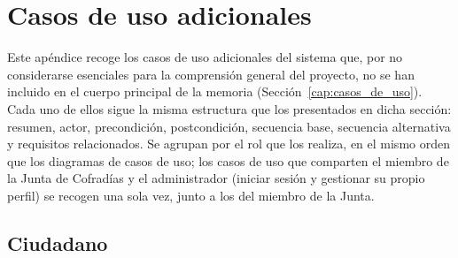 \chapter{Casos de uso adicionales}\label{cap:casos_de_uso_adicionales}

Este apéndice recoge los casos de uso adicionales del sistema que, por no considerarse esenciales para la comprensión general del proyecto, no se han incluido en el cuerpo principal de la memoria (Sección~\ref{cap:casos_de_uso}). Cada uno de ellos sigue la misma estructura que los presentados en dicha sección: resumen, actor, precondición, postcondición, secuencia base, secuencia alternativa y requisitos relacionados. Se agrupan por el rol que los realiza, en el mismo orden que los diagramas de casos de uso; los casos de uso que comparten el miembro de la Junta de Cofradías y el administrador (iniciar sesión y gestionar su propio perfil) se recogen una sola vez, junto a los del miembro de la Junta.

\section{Ciudadano}

